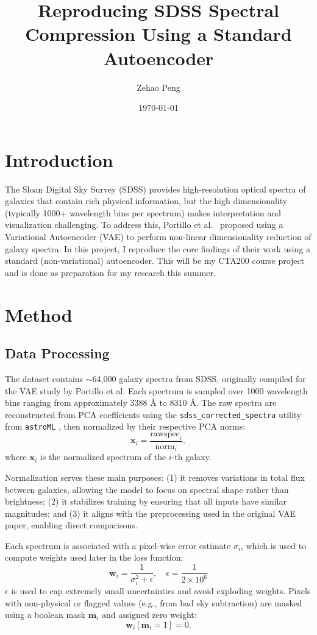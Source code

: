 \documentclass[11pt]{article}
\title{Reproducing SDSS Spectral Compression Using a Standard Autoencoder}
\author{Zehao Peng}
\date{\today}
\begin{document}
\maketitle

\section{Introduction}
The Sloan Digital Sky Survey (SDSS) provides high-resolution optical spectra of galaxies that contain rich physical information, but the high dimensionality (typically 1000+ wavelength bins per spectrum) makes interpretation and visualization challenging. To address this, Portillo et al.\ \citep{Portillo2020} proposed using a Variational Autoencoder (VAE) to perform non-linear dimensionality reduction of galaxy spectra. In this project, I reproduce the core findings of their work using a standard (non-variational) autoencoder. This will be my CTA200 course project and is done as preparation for my research this summer. 

\section{Method}
\subsection{Data Processing}
The dataset contains $\sim$64,000 galaxy spectra from SDSS, originally compiled for the VAE study by Portillo et al. Each spectrum is sampled over 1000 wavelength bins ranging from approximately 3388 \AA{} to 8310 \AA{}. The raw spectra are reconstructed from PCA coefficients using the \texttt{sdss\_corrected\_spectra} utility from \texttt{astroML} \citep{VanderPlas2012}, then normalized by their respective PCA norms:
\begin{equation}
\mathbf{x}_i = \frac{\text{rawspec}_i}{\text{norm}_i},
\end{equation}
where $\mathbf{x}_i$ is the normalized spectrum of the $i$-th galaxy.

Normalization serves these main purposes: (1) it removes variations in total flux between galaxies, allowing the model to focus on spectral shape rather than brightness; (2) it stabilizes training by ensuring that all inputs have similar magnitudes; and (3) it aligns with the preprocessing used in the original VAE paper, enabling direct comparisons.

Each spectrum is associated with a pixel-wise error estimate $\sigma_i$, which is used to compute weights used later in the loss function:
\begin{equation}
\mathbf{w}_i = \frac{1}{\sigma_i^2 + \epsilon}, \quad \epsilon = \frac{1}{2 \times 10^6}
\end{equation}
$\epsilon$ is used to cap extremely small uncertainties and avoid exploding weights. Pixels with non-physical or flagged values (e.g., from bad sky subtraction) are masked using a boolean mask $\mathbf{m}_i$ and assigned zero weight:
\begin{equation}
\mathbf{w}_i[\mathbf{m}_i = 1] = 0.
\end{equation}
\end{document}
